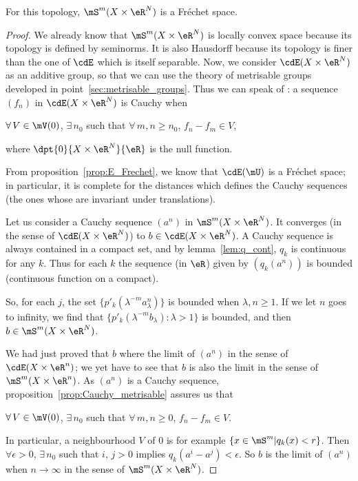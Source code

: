 \begin{proposition}
	For this topology, $\mS^m(X\times\eR^N)$ is a Fréchet space.
\end{proposition}
\begin{proof}
	We already know that $\mS^m(X\times\eR^N)$ is locally convex space because its topology is defined by seminorms. It is also Hausdorff because its topology is finer than the one of $\cdE$ which is itself separable. Now, we consider $\cdE(X\times \eR^N)$ as an additive group, so that we can use the theory of metrisable groups developed in point~\ref{sec:metrisable_groups}. Thus we can speak of : a sequence $(f_n)$
	in $\cdE(X\times \eR^N)$ is Cauchy when

	$\forall\,V\in\mV(0)$, $\exists\,n_0$ such that $\forall\,m,n\geq n_0$, $f_n-f_m\in V$,

	\noindent where $\dpt{0}{X\times \eR^N}{\eR}$ is the null function.

	From proposition~\ref{prop:E_Frechet}, we know that $\cdE(\mU)$ is a Fréchet space; in particular, it is complete for the distances which defines the Cauchy sequences (the ones whose are invariant under translations).

	Let us consider a Cauchy sequence $(a^n)$ in $\mS^m(X\times\eR^N)$. It converges (in the sense of $\cdE(X\times \eR^N)$) to $b\in\cdE(X\times \eR^N)$. A Cauchy sequence is always contained in a compact set, and by lemma~\ref{lem:q_cont}, $q_k$ is continuous for any $k$. Thus for each $k$ the sequence (in $\eR$) given by $(q_k(a^n))$ is bounded (continuous function on a compact).

	So, for each $j$, the set $\{p'_k(\lambda^{-m}a^n_{\lambda})\}$ is bounded when $\lambda,n\geq 1$. If we let $n$ goes to infinity, we find that $\{p'_k(\lambda^{-m}b_{\lambda}):\lambda>1\}$ is bounded, and then $b\in\mS^m(X\times\eR^N)$.

	We had just proved that $b$ where the limit of $(a^n)$ in the sense of $\cdE(X\times\eR^n)$; we yet have to see that $b$ is also the limit in the sense of $\mS^m(X\times\eR^n)$. As $(a^n)$ is a Cauchy sequence, proposition~\ref{prop:Cauchy_metrisable} assures us that

	$\forall\,V\in\mV(0)$, $\exists\,n_0$ such that $\forall\,m,n\geq 0$, $f_n-f_m\in V$.

	\noindent In particular, a neighbourhood $V$ of $0$ is for example $\{x\in\mS^m|q_k(x)<r\}$. Then $\forall\epsilon>0$, $\exists\,n_0$ such that $i$, $j>0$ implies $q_k(a^i-a^j)<\epsilon$. So $b$ is the limit of $(a^n)$ when $n\to\infty$ in the sense of $\mS^m(X\times\eR^N)$.

\end{proof}

